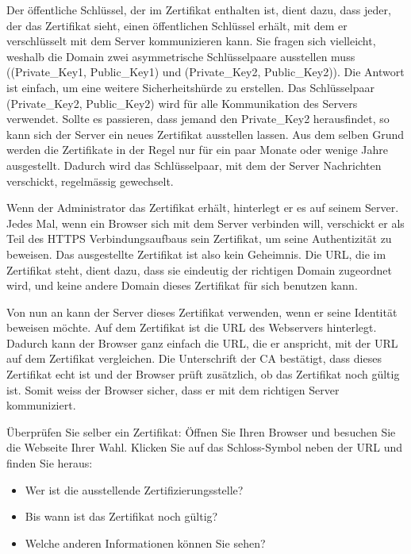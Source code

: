         Der öffentliche Schlüssel, der im Zertifikat enthalten ist, dient dazu, dass jeder, der das Zertifikat sieht, einen öffentlichen Schlüssel erhält, mit dem er verschlüsselt mit dem Server kommunizieren kann. Sie fragen sich vielleicht, weshalb die Domain zwei asymmetrische Schlüsselpaare ausstellen muss ((Private\_Key1, Public\_Key1) und (Private\_Key2, Public\_Key2)). Die Antwort ist einfach, um eine weitere Sicherheitshürde zu erstellen. Das Schlüsselpaar (Private\_Key2, Public\_Key2) wird für alle Kommunikation des Servers verwendet. Sollte es passieren, dass jemand den Private\_Key2 herausfindet, so kann sich der Server ein neues Zertifikat ausstellen lassen. Aus dem selben Grund werden die Zertifikate in der Regel nur für ein paar Monate oder wenige Jahre ausgestellt. Dadurch wird das Schlüsselpaar, mit dem der Server Nachrichten verschickt, regelmässig gewechselt.

        Wenn der Administrator das Zertifikat erhält, hinterlegt er es auf seinem Server. Jedes Mal, wenn ein Browser sich mit dem Server verbinden will, verschickt er als Teil des HTTPS Verbindungsaufbaus sein Zertifikat, um seine Authentizität zu beweisen. Das ausgestellte Zertifikat ist also kein Geheimnis. Die URL, die im Zertifikat steht, dient dazu, dass sie eindeutig der richtigen Domain zugeordnet wird, und keine andere Domain dieses Zertifikat für sich benutzen kann.

        Von nun an kann der Server dieses Zertifikat verwenden, wenn er seine Identität beweisen möchte. Auf dem Zertifikat ist die URL des Webservers hinterlegt. Dadurch kann der Browser ganz einfach die URL, die er anspricht, mit der URL auf dem Zertifikat vergleichen. Die Unterschrift der CA bestätigt, dass dieses Zertifikat echt ist und der Browser prüft zusätzlich, ob das Zertifikat noch gültig ist. Somit weiss der Browser sicher, dass er mit dem richtigen Server kommuniziert.

        \begin{myexercise}
            Überprüfen Sie selber ein Zertifikat: Öffnen Sie Ihren Browser und besuchen Sie die Webseite Ihrer Wahl. Klicken Sie auf das Schloss-Symbol neben der URL und finden Sie heraus:
            \begin{itemize}
                \item Wer ist die ausstellende Zertifizierungsstelle?
                \item Bis wann ist das Zertifikat noch gültig?
                \item Welche anderen Informationen können Sie sehen?
            \end{itemize}
        \end{myexercise}

